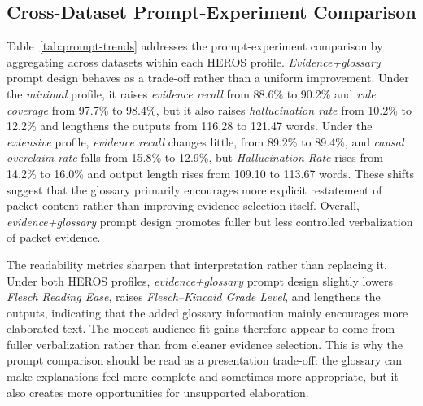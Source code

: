 \documentclass[sigconf]{acmart}
\begin{document}
\subsection{Cross-Dataset Prompt-Experiment Comparison}
Table~\ref{tab:prompt-trends} addresses the prompt-experiment comparison by aggregating across datasets within each HEROS profile. \emph{Evidence+glossary} prompt design behaves as a trade-off rather than a uniform improvement. Under the \emph{minimal} profile, it raises \emph{evidence recall} from 88.6\% to 90.2\% and \emph{rule coverage} from 97.7\% to 98.4\%, but it also raises \emph{hallucination rate} from 10.2\% to 12.2\% and lengthens the outputs from 116.28 to 121.47 words. Under the \emph{extensive} profile, \emph{evidence recall} changes little, from 89.2\% to 89.4\%, and \emph{causal overclaim rate} falls from 15.8\% to 12.9\%, but \emph{Hallucination Rate} rises from 14.2\% to 16.0\% and output length rises from 109.10 to 113.67 words. These shifts suggest that the glossary primarily encourages more explicit restatement of packet content rather than improving evidence selection itself. Overall, \emph{evidence+glossary} prompt design promotes fuller but less controlled verbalization of packet evidence.

The readability metrics sharpen that interpretation rather than replacing it. Under both HEROS profiles, \emph{evidence+glossary} prompt design slightly lowers \emph{Flesch Reading Ease}, raises \emph{Flesch--Kincaid Grade Level}, and lengthens the outputs, indicating that the added glossary information mainly encourages more elaborated text. The modest audience-fit gains therefore appear to come from fuller verbalization rather than from cleaner evidence selection. This is why the prompt comparison should be read as a presentation trade-off: the glossary can make explanations feel more complete and sometimes more appropriate, but it also creates more opportunities for unsupported elaboration.
\end{document}
